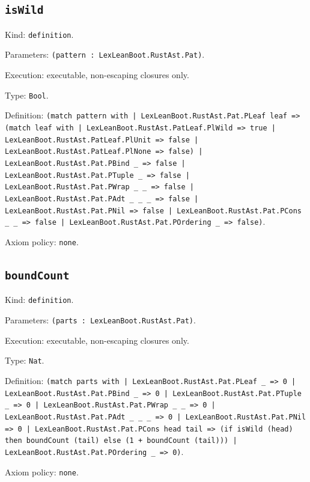 \documentclass[11pt]{article}
\begin{document}
\subsection*{\texttt{isWild}}
\noindent Kind: \texttt{definition}.\par
\noindent Parameters: \texttt{(pattern : LexLeanBoot.RustAst.Pat)}.\par
\noindent Execution: executable, non-escaping closures only.\par
\noindent Type: \texttt{Bool}.\par
\noindent Definition: \texttt{(match pattern with | LexLeanBoot.RustAst.Pat.PLeaf leaf => (match leaf with | LexLeanBoot.RustAst.PatLeaf.PlWild => true | LexLeanBoot.RustAst.PatLeaf.PlUnit => false | LexLeanBoot.RustAst.PatLeaf.PlNone => false) | LexLeanBoot.RustAst.Pat.PBind \_ => false | LexLeanBoot.RustAst.Pat.PTuple \_ => false | LexLeanBoot.RustAst.Pat.PWrap \_ \_ => false | LexLeanBoot.RustAst.Pat.PAdt \_ \_ \_ => false | LexLeanBoot.RustAst.Pat.PNil => false | LexLeanBoot.RustAst.Pat.PCons \_ \_ => false | LexLeanBoot.RustAst.Pat.POrdering \_ => false)}.\par
\noindent Axiom policy: \texttt{none}.\par
\subsection*{\texttt{boundCount}}
\noindent Kind: \texttt{definition}.\par
\noindent Parameters: \texttt{(parts : LexLeanBoot.RustAst.Pat)}.\par
\noindent Execution: executable, non-escaping closures only.\par
\noindent Type: \texttt{Nat}.\par
\noindent Definition: \texttt{(match parts with | LexLeanBoot.RustAst.Pat.PLeaf \_ => 0 | LexLeanBoot.RustAst.Pat.PBind \_ => 0 | LexLeanBoot.RustAst.Pat.PTuple \_ => 0 | LexLeanBoot.RustAst.Pat.PWrap \_ \_ => 0 | LexLeanBoot.RustAst.Pat.PAdt \_ \_ \_ => 0 | LexLeanBoot.RustAst.Pat.PNil => 0 | LexLeanBoot.RustAst.Pat.PCons head tail => (if isWild (head) then boundCount (tail) else (1 + boundCount (tail))) | LexLeanBoot.RustAst.Pat.POrdering \_ => 0)}.\par
\noindent Axiom policy: \texttt{none}.\par
\end{document}
